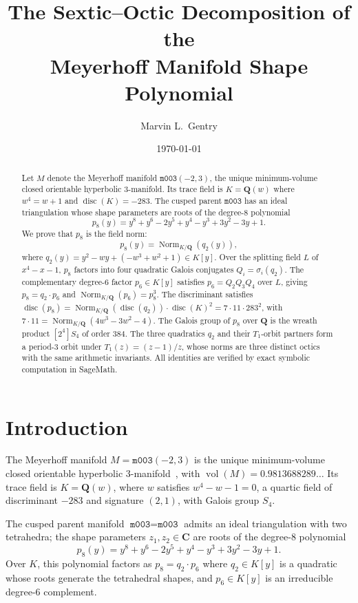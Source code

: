 \documentclass[12pt]{amsart}
\title{The Sextic--Octic Decomposition of the\\
Meyerhoff Manifold Shape Polynomial}
\author{Marvin L.\ Gentry}
\date{\today}
\theoremstyle{definition}
\newcommand{\QQ}{\mathbf{Q}}
\newcommand{\CC}{\mathbf{C}}
\DeclareMathOperator{\Norm}{Norm}
\DeclareMathOperator{\disc}{disc}
\DeclareMathOperator{\vol}{vol}
\newcommand{\M}{\texttt{m003}}
\newcommand{\Meyer}{\texttt{m003}(-2,3)}
\begin{document}
\begin{abstract}
Let $M$ denote the Meyerhoff manifold $\Meyer$, the unique minimum-volume
closed orientable hyperbolic 3-manifold. Its trace field is
$K = \QQ(w)$ where $w^4 = w + 1$ and $\disc(K) = -283$.
The cusped parent $\M$ has an ideal triangulation whose
shape parameters are roots of the degree-8 polynomial
\[
  p_8(y) = y^8 + y^6 - 2y^5 + y^4 - y^3 + 3y^2 - 3y + 1.
\]
We prove that $p_8$ is the field norm:
\[
  p_8(y) = \Norm_{K/\QQ}(q_2(y)),
\]
where $q_2(y) = y^2 - wy + (-w^3 + w^2 + 1) \in K[y]$.
Over the splitting field $L$ of $x^4 - x - 1$, $p_8$ factors into
four quadratic Galois conjugates $Q_i = \sigma_i(q_2)$.
The complementary degree-6 factor $p_6 \in K[y]$ satisfies
$p_6 = Q_2 Q_3 Q_4$ over $L$, giving $p_8 = q_2 \cdot p_6$ and
$\Norm_{K/\QQ}(p_6) = p_8^3$.
The discriminant satisfies
$\disc(p_8) = \Norm_{K/\QQ}(\disc(q_2)) \cdot \disc(K)^2 = 7 \cdot 11 \cdot 283^2$,
with $7 \cdot 11 = \Norm_{K/\QQ}(4w^3 - 3w^2 - 4)$.
The Galois group of $p_8$ over $\QQ$ is the wreath product $[2^4]S_4$
of order $384$.
The three quadratics $q_2$ and their $T_1$-orbit partners form a
period-3 orbit under $T_1(z) = (z-1)/z$, whose norms are three
distinct octics with the same arithmetic invariants.
All identities are verified by exact symbolic computation in SageMath.
\end{abstract}

\maketitle

\section{Introduction}

The Meyerhoff manifold $M = \Meyer$ is the unique minimum-volume
closed orientable hyperbolic 3-manifold~\cite{GMM09},
with $\vol(M) = 0.9813688289\ldots$
Its trace field is $K = \QQ(w)$, where $w$ satisfies $w^4 - w - 1 = 0$,
a quartic field of discriminant $-283$ and signature $(2,1)$,
with Galois group $S_4$.

The cusped parent manifold $\M = \texttt{m003}$ admits an ideal
triangulation with two tetrahedra; the shape parameters
$z_1, z_2 \in \CC$ are roots of the degree-8 polynomial
\begin{equation}\label{eq:p8}
  p_8(y) = y^8 + y^6 - 2y^5 + y^4 - y^3 + 3y^2 - 3y + 1.
\end{equation}
Over $K$, this polynomial factors as $p_8 = q_2 \cdot p_6$ where
$q_2 \in K[y]$ is a quadratic whose roots generate the tetrahedral
shapes, and $p_6 \in K[y]$ is an irreducible degree-6 complement.
\end{document}

